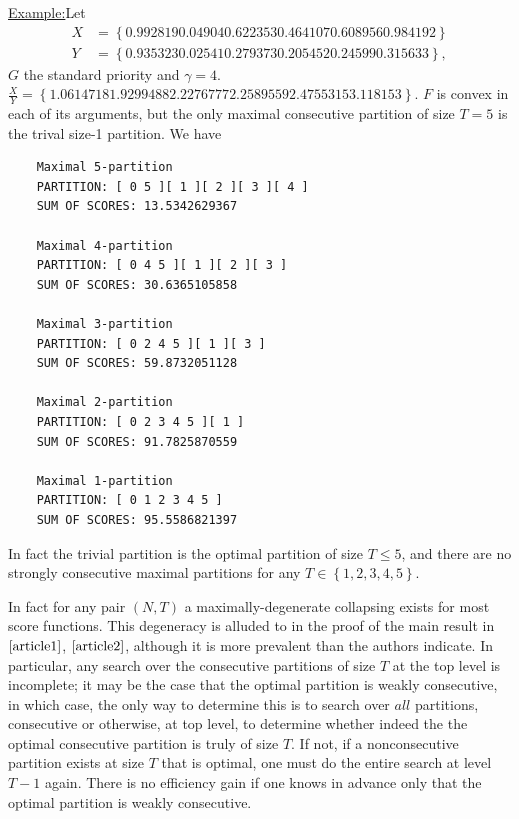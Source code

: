 \documentclass{article}
\theoremstyle{case}
\newenvironment{example}[1]{\par\noindent\underline{Example:}\space#1}{}
\begin{document}
\begin{example}
Let 
\begin{align*}
X & = \left\lbrace 0.992819 0.04904 0.622353 0.464107 0.608956 0.984192 \right\rbrace \\
Y & = \left\lbrace 0.935323 0.02541 0.279373 0.205452 0.24599 0.315633 \right\rbrace,
\end{align*}
$G$ the standard priority and $\gamma = 4$. $\frac{X}{Y} = \left\lbrace 1.0614718 1.9299488 2.2276777 2.2589559 2.4755315 3.118153 \right\rbrace$. $F$ is convex in each of its arguments, but the only maximal consecutive partition of size $T = 5$ is the trival size-1 partition. We have

\begin{verbatim}
    Maximal 5-partition
    PARTITION: [ 0 5 ][ 1 ][ 2 ][ 3 ][ 4 ]
    SUM OF SCORES: 13.5342629367

    Maximal 4-partition
    PARTITION: [ 0 4 5 ][ 1 ][ 2 ][ 3 ]
    SUM OF SCORES: 30.6365105858

    Maximal 3-partition
    PARTITION: [ 0 2 4 5 ][ 1 ][ 3 ]
    SUM OF SCORES: 59.8732051128

    Maximal 2-partition
    PARTITION: [ 0 2 3 4 5 ][ 1 ]
    SUM OF SCORES: 91.7825870559

    Maximal 1-partition
    PARTITION: [ 0 1 2 3 4 5 ]
    SUM OF SCORES: 95.5586821397
\end{verbatim}
In fact the trivial partition is the optimal partition of size $T \leq 5$, and there are no strongly consecutive maximal partitions for any $T \in \left\lbrace 1, 2, 3, 4, 5\right\rbrace$.

\end{example}
In fact for any pair $\left( N, T\right)$ a maximally-degenerate collapsing exists for most score functions. This degeneracy is alluded to in the proof of the main result in $\cite{article1}$, $\cite{article2}$, although it is more prevalent than the authors indicate. In particular, any search over the consecutive partitions of size $T$ at the top level is incomplete; it may be the case that the optimal partition is weakly consecutive, in which case, the only way to determine this is to search over $\textit{all}$ partitions, consecutive or otherwise, at top level, to determine whether indeed the the optimal consecutive partition is truly of size $T$. If not, if a nonconsecutive partition exists at size $T$ that is optimal, one must do the entire search at level $T-1$ again. There is no efficiency gain if one knows in advance only that the optimal partition is weakly consecutive. 
\end{document}
